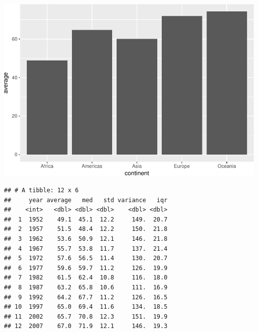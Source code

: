 \documentclass[12pt,]{article}
\newenvironment{Shaded}{\begin{snugshade}}{\end{snugshade}}
\newcommand{\KeywordTok}[1]{\textcolor[rgb]{0.13,0.29,0.53}{\textbf{#1}}}
\newcommand{\DataTypeTok}[1]{\textcolor[rgb]{0.13,0.29,0.53}{#1}}
\newcommand{\StringTok}[1]{\textcolor[rgb]{0.31,0.60,0.02}{#1}}
\newcommand{\OperatorTok}[1]{\textcolor[rgb]{0.81,0.36,0.00}{\textbf{#1}}}
\newcommand{\NormalTok}[1]{#1}
\begin{document}
\includegraphics{Intro_data_wrangling_files/figure-latex/summ_cont-1.pdf}

\begin{Shaded}
\end{Shaded}

\begin{verbatim}
## # A tibble: 12 x 6
##     year average   med   std variance   iqr
##    <int>   <dbl> <dbl> <dbl>    <dbl> <dbl>
##  1  1952    49.1  45.1  12.2     149.  20.7
##  2  1957    51.5  48.4  12.2     150.  21.8
##  3  1962    53.6  50.9  12.1     146.  21.8
##  4  1967    55.7  53.8  11.7     137.  21.4
##  5  1972    57.6  56.5  11.4     130.  20.7
##  6  1977    59.6  59.7  11.2     126.  19.9
##  7  1982    61.5  62.4  10.8     116.  18.0
##  8  1987    63.2  65.8  10.6     111.  16.9
##  9  1992    64.2  67.7  11.2     126.  16.5
## 10  1997    65.0  69.4  11.6     134.  18.5
## 11  2002    65.7  70.8  12.3     151.  19.9
## 12  2007    67.0  71.9  12.1     146.  19.3
\end{verbatim}
\end{document}
